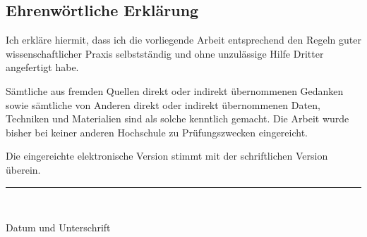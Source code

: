 \documentclass[a4paper,justified,titlepage,twoside,nobib,symmetric]{tufte-book}
\begin{document}
\pagestyle{nothing}
\ChaptersOutsidePart
\begin{fullwidth}

\chapter*{Ehrenwörtliche Erklärung} %

Ich erkläre hiermit, dass ich die vorliegende Arbeit
entsprechend den Regeln guter wissenschaftlicher Praxis selbstständig und ohne
unzulässige Hilfe Dritter angefertigt habe.

Sämtliche aus fremden Quellen direkt oder indirekt übernommenen Gedanken sowie
sämtliche von Anderen direkt oder indirekt übernommenen Daten, Techniken und
Materialien sind als solche kenntlich gemacht.
Die Arbeit wurde bisher bei keiner anderen Hochschule zu Prüfungszwecken
eingereicht.

Die eingereichte elektronische Version stimmt mit der schriftlichen Version
überein.

\vspace{1cm}

\par\noindent\rule{6cm}{0.4pt} \\
\strut \footnotesize Datum und Unterschrift \\
\end{fullwidth}
\ChaptersInsidePart
\end{document}
